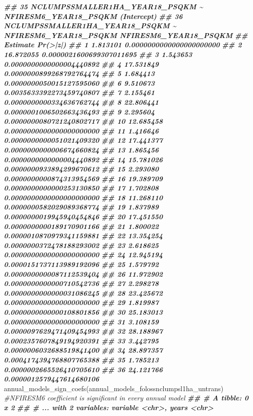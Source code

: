 \documentclass[10pt,landscape,a3paper]{article}
\newenvironment{Shaded}{\begin{snugshade}}{\end{snugshade}}
\newcommand{\CommentTok}[1]{\textcolor[rgb]{0.56,0.35,0.01}{\textit{#1}}}
\newcommand{\DocumentationTok}[1]{\textcolor[rgb]{0.56,0.35,0.01}{\textbf{\textit{#1}}}}
\newcommand{\FunctionTok}[1]{\textcolor[rgb]{0.00,0.00,0.00}{#1}}
\newcommand{\NormalTok}[1]{#1}
\begin{document}
\begin{Shaded}
\begin{Highlighting}[]
\DocumentationTok{\#\# 35 NCLUMPSSMALLER1HA\_YEAR18\_PSQKM \textasciitilde{} NFIRESM6\_YEAR18\_PSQKM           (Intercept)}
\DocumentationTok{\#\# 36 NCLUMPSSMALLER1HA\_YEAR18\_PSQKM \textasciitilde{} NFIRESM6\_YEAR18\_PSQKM NFIRESM6\_YEAR18\_PSQKM}
\DocumentationTok{\#\#     Estimate                 Pr(\textgreater{}|z|)}
\DocumentationTok{\#\# 1   1.813101 0.0000000000000000000000}
\DocumentationTok{\#\# 2  16.872055 0.0000021600699307011695}
\DocumentationTok{\#\# 3   1.543653 0.0000000000000004440892}
\DocumentationTok{\#\# 4  17.531849 0.0000000899268792764474}
\DocumentationTok{\#\# 5   1.684413 0.0000000050015127595060}
\DocumentationTok{\#\# 6   9.510673 0.0035633392273459740807}
\DocumentationTok{\#\# 7   2.155461 0.0000000000334636762744}
\DocumentationTok{\#\# 8  22.806441 0.0000001006502663436493}
\DocumentationTok{\#\# 9   2.295604 0.0000000080721240802717}
\DocumentationTok{\#\# 10 12.685458 0.0000000000000000000000}
\DocumentationTok{\#\# 11  1.416646 0.0000000000051021409320}
\DocumentationTok{\#\# 12 17.441377 0.0000000000006674660824}
\DocumentationTok{\#\# 13  1.865456 0.0000000000000004440892}
\DocumentationTok{\#\# 14 15.781026 0.0000000933894299670612}
\DocumentationTok{\#\# 15  2.293080 0.0000000000874313954569}
\DocumentationTok{\#\# 16 19.389709 0.0000000000000253130850}
\DocumentationTok{\#\# 17  1.702808 0.0000000000000000000000}
\DocumentationTok{\#\# 18 11.268110 0.0000000582029089368774}
\DocumentationTok{\#\# 19  1.837989 0.0000000019945940454846}
\DocumentationTok{\#\# 20 17.451550 0.0000000000189170901166}
\DocumentationTok{\#\# 21  1.800022 0.0000010870979341159881}
\DocumentationTok{\#\# 22 13.354254 0.0000000372478188293002}
\DocumentationTok{\#\# 23  2.618625 0.0000000000000000000000}
\DocumentationTok{\#\# 24 12.945194 0.0000151737113989192096}
\DocumentationTok{\#\# 25  1.579792 0.0000000000087112539404}
\DocumentationTok{\#\# 26 11.972902 0.0000000000000710542736}
\DocumentationTok{\#\# 27  2.298278 0.0000000000000031086245}
\DocumentationTok{\#\# 28 23.425672 0.0000000000000000000000}
\DocumentationTok{\#\# 29  1.819987 0.0000000000000108801856}
\DocumentationTok{\#\# 30 25.183013 0.0000000000000000000000}
\DocumentationTok{\#\# 31  3.108159 0.0000097629471409454993}
\DocumentationTok{\#\# 32 28.188967 0.0002357607849194920391}
\DocumentationTok{\#\# 33  3.442795 0.0000006032688519841400}
\DocumentationTok{\#\# 34 28.897357 0.0004174394768807765388}
\DocumentationTok{\#\# 35  1.785213 0.0000002665526410705610}
\DocumentationTok{\#\# 36 24.121766 0.0000012579447614680106}
\FunctionTok{annual\_models\_sign\_coefs}\NormalTok{(annual\_models\_folossnclumpsl1ha\_untrans)  }\CommentTok{\#NFIRESM6 coefficient is significant in every annual model}
\DocumentationTok{\#\# \# A tibble: 0 x 2}
\DocumentationTok{\#\# \# ... with 2 variables: variable \textless{}chr\textgreater{}, years \textless{}chr\textgreater{}}
\end{Highlighting}
\end{Shaded}
\end{document}
